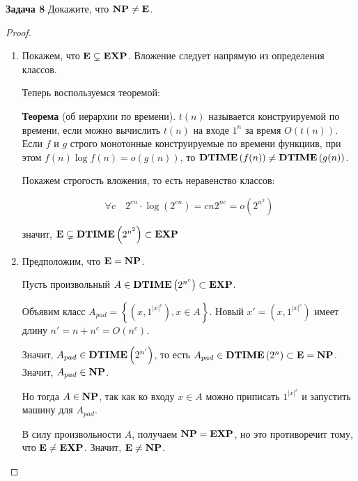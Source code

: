 \textbf{Задача 8} Докажите, что $\textbf{NP}\neq\textbf{E}$.

\begin{proof}

\begin{enumerate}
    \item Покажем, что $\textbf{E}\subsetneq\textbf{EXP}$. Вложение следует напрямую из определения классов.
    
    Теперь воспользуемся теоремой:

    \textbf{Теорема} (об иерархии по времени). $t(n)$ называется конструируемой по времени, если можно вычислить $t(n)$ на входе $1^n$ за время $O(t(n))$. Если $f$ и $g$ строго монотонные конструируемые по времени функциив, при этом $f(n)\log f(n)= o(g(n))$, то $\textbf{DTIME}\left({f(n)}\right)\neq\textbf{DTIME}\left({g(n)}\right)$. 
    
    Покажем строгость вложения, то есть неравенство классов:
    
    \[\forall c \quad 2^{cn} \cdot \log\left(2^{cn}\right) = cn2^{nc} = o\left(2^{n^2}\right)\]
    
    значит, $\textbf{E} \subsetneq \textbf{DTIME}\left({2^{n^2}}\right) \subset \textbf{EXP}$
    
    \item Предположим, что $\textbf{E} = \textbf{NP}$. 

    Пусть произвольный $A \in \textbf{DTIME}\left({2^{n^c}}\right) \subset \textbf{EXP}$.
    
    Объявим класс $A_{pad} = \left\{\left(x,1^{|x|^c}\right), x \in A \right\}$.
    Новый $x' = \left(x,1^{|x|^c}\right)$ имеет длину $n' = n + n^c = O(n^c)$.
    
    Значит, $A_{pad} \in \textbf{DTIME}\left({2^{n'}}\right)$, то есть $A_{pad} \in \textbf{DTIME}\left({2^{n}}\right) \subset \textbf{E} = \textbf{NP}$. Значит, $A_{pad} \in \textbf{NP}$.
    
    Но тогда $A \in \textbf{NP}$, так как ко входу $x \in A$ можно приписать $1^{|x|^c}$ и запустить машину для $A_{pad}$.
    
    В силу произвольности $A$, получаем $\textbf{NP}=\textbf{EXP}$, но это противоречит тому, что $\textbf{E} \neq \textbf{EXP}$. Значит, $\textbf{E} \neq \textbf{NP}$. 
\end{enumerate}

\end{proof}
